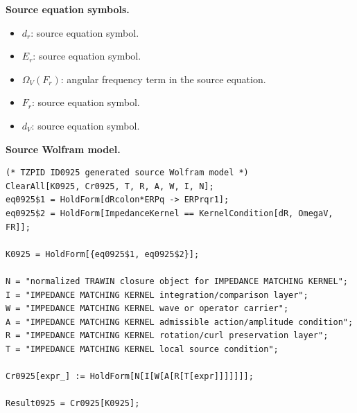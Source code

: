 \begin{minipage}[t]{0.49\linewidth}
\begingroup
\small
\raggedright
\textbf{Source equation symbols.}\par
\begin{itemize}[leftmargin=1.35em,itemsep=1pt,topsep=1pt,parsep=0pt]
    \item $d_r$: source equation symbol.
    \item $E_r$: source equation symbol.
    \item $\Omega_V(F_r)$: angular frequency term in the source equation.
    \item $F_r$: source equation symbol.
    \item $d_V$: source equation symbol.
\end{itemize}
\endgroup
\end{minipage}\hfill
\begin{minipage}[t]{0.47\linewidth}
\begingroup
\scriptsize
\raggedright
\textbf{Source Wolfram model.}\par
\begin{Verbatim}[fontsize=\tiny,breaklines=true,breakanywhere=true]
(* TZPID ID0925 generated source Wolfram model *)
ClearAll[K0925, Cr0925, T, R, A, W, I, N];
eq0925$1 = HoldForm[dRcolon*ERPq -> ERPrqr1];
eq0925$2 = HoldForm[ImpedanceKernel == KernelCondition[dR, OmegaV, FR]];

K0925 = HoldForm[{eq0925$1, eq0925$2}];

N = "normalized TRAWIN closure object for IMPEDANCE MATCHING KERNEL";
I = "IMPEDANCE MATCHING KERNEL integration/comparison layer";
W = "IMPEDANCE MATCHING KERNEL wave or operator carrier";
A = "IMPEDANCE MATCHING KERNEL admissible action/amplitude condition";
R = "IMPEDANCE MATCHING KERNEL rotation/curl preservation layer";
T = "IMPEDANCE MATCHING KERNEL local source condition";

Cr0925[expr_] := HoldForm[N[I[W[A[R[T[expr]]]]]]];

Result0925 = Cr0925[K0925];
\end{Verbatim}
\endgroup
\end{minipage}

